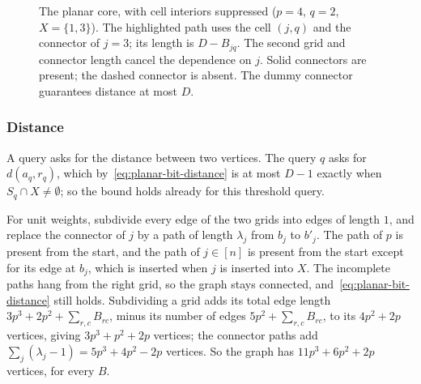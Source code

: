 \begin{figure}[ht]
\centering
{}
\caption{The planar core, with cell interiors suppressed ($p=4$, $q=2$, $X=\{1,3\}$). The highlighted path uses the cell $(j,q)$ and the connector of $j=3$; its length is $D-B_{jq}$. The second grid and connector length cancel the dependence on $j$. Solid connectors are present; the dashed connector is absent. The dummy connector guarantees distance at most $D$.}
\label{fig:planar-core}
\end{figure}

\subsubsection{Distance}\label{sec:planar-distance}

A query asks for the distance between two vertices. The query $q$ asks for $d(a_q,r_q)$, which by~\eqref{eq:planar-bit-distance} is at most $D-1$ exactly when $S_q\cap X\ne\emptyset$; so the bound holds already for this threshold query.

For unit weights, subdivide every edge of the two grids into edges of length $1$, and replace the connector of $j$ by a path of length $\lambda_j$ from $b_j$ to $b'_j$. The path of $p$ is present from the start, and the path of $j\in[n]$ is present from the start except for its edge at $b_j$, which is inserted when $j$ is inserted into $X$. The incomplete paths hang from the right grid, so the graph stays connected, and~\eqref{eq:planar-bit-distance} still holds. Subdividing a grid adds its total edge length $3p^3+2p^2+\sum_{r,c}B_{rc}$, minus its number of edges $5p^2+\sum_{r,c}B_{rc}$, to its $4p^2+2p$ vertices, giving $3p^3+p^2+2p$ vertices; the connector paths add $\sum_j(\lambda_j-1)=5p^3+4p^2-2p$ vertices. So the graph has $11p^3+6p^2+2p$ vertices, for every $B$.

